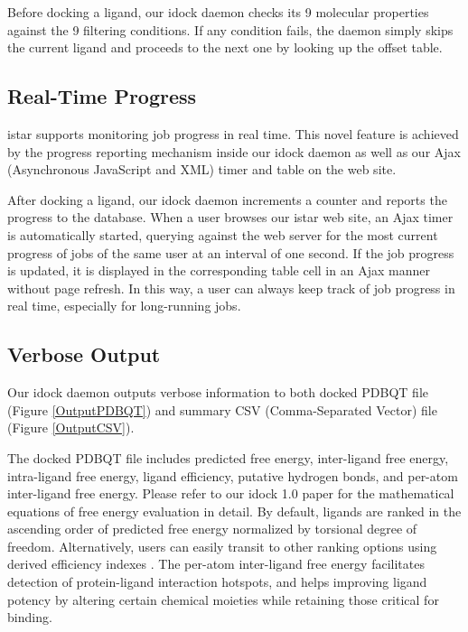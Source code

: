 \documentclass[12pt]{article}
\begin{document}
Before docking a ligand, our idock daemon checks its 9 molecular properties against the 9 filtering conditions. If any condition fails, the daemon simply skips the current ligand and proceeds to the next one by looking up the offset table.

\subsection*{\sffamily \large Real-Time Progress}

istar supports monitoring job progress in real time. This novel feature is achieved by the progress reporting mechanism inside our idock daemon as well as our Ajax (Asynchronous JavaScript and XML) timer and table on the web site.

After docking a ligand, our idock daemon increments a counter and reports the progress to the database. When a user browses our istar web site, an Ajax timer is automatically started, querying against the web server for the most current progress of jobs of the same user at an interval of one second. If the job progress is updated, it is displayed in the corresponding table cell in an Ajax manner without page refresh. In this way, a user can always keep track of job progress in real time, especially for long-running jobs.

\subsection*{\sffamily \large Verbose Output}

Our idock daemon outputs verbose information to both docked PDBQT file (Figure \ref{OutputPDBQT}) and summary CSV (Comma-Separated Vector) file (Figure \ref{OutputCSV}).

The docked PDBQT file includes predicted free energy, inter-ligand free energy, intra-ligand free energy, ligand efficiency, putative hydrogen bonds, and per-atom inter-ligand free energy. Please refer to our idock 1.0 paper \citep{1153} for the mathematical equations of free energy evaluation in detail. By default, ligands are ranked in the ascending order of predicted free energy normalized by torsional degree of freedom. Alternatively, users can easily transit to other ranking options using derived efficiency indexes \citep{335,336,337}. The per-atom inter-ligand free energy facilitates detection of protein-ligand interaction hotspots, and helps improving ligand potency by altering certain chemical moieties while retaining those critical for binding.
\end{document}

